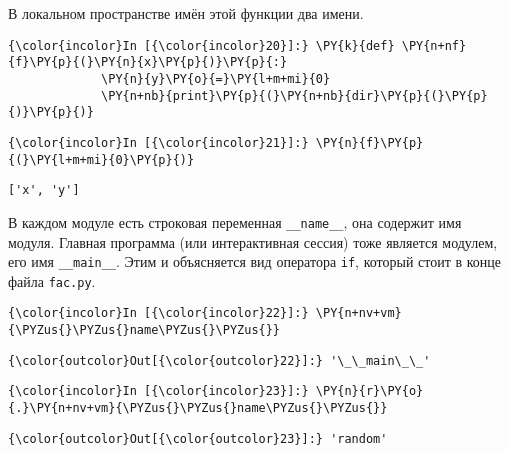    В локальном пространстве имён этой функции два имени.

    \begin{Verbatim}[commandchars=\\\{\}]
{\color{incolor}In [{\color{incolor}20}]:} \PY{k}{def} \PY{n+nf}{f}\PY{p}{(}\PY{n}{x}\PY{p}{)}\PY{p}{:}
             \PY{n}{y}\PY{o}{=}\PY{l+m+mi}{0}
             \PY{n+nb}{print}\PY{p}{(}\PY{n+nb}{dir}\PY{p}{(}\PY{p}{)}\PY{p}{)}
\end{Verbatim}

    \begin{Verbatim}[commandchars=\\\{\}]
{\color{incolor}In [{\color{incolor}21}]:} \PY{n}{f}\PY{p}{(}\PY{l+m+mi}{0}\PY{p}{)}
\end{Verbatim}

    \begin{Verbatim}[commandchars=\\\{\}]
['x', 'y']

    \end{Verbatim}

    В каждом модуле есть строковая переменная \texttt{\_\_name\_\_}, она
содержит имя модуля. Главная программа (или интерактивная сессия) тоже
является модулем, его имя \texttt{\_\_main\_\_}. Этим и объясняется вид
оператора \texttt{if}, который стоит в конце файла \texttt{fac.py}.

    \begin{Verbatim}[commandchars=\\\{\}]
{\color{incolor}In [{\color{incolor}22}]:} \PY{n+nv+vm}{\PYZus{}\PYZus{}name\PYZus{}\PYZus{}}
\end{Verbatim}

            \begin{Verbatim}[commandchars=\\\{\}]
{\color{outcolor}Out[{\color{outcolor}22}]:} '\_\_main\_\_'
\end{Verbatim}
        
    \begin{Verbatim}[commandchars=\\\{\}]
{\color{incolor}In [{\color{incolor}23}]:} \PY{n}{r}\PY{o}{.}\PY{n+nv+vm}{\PYZus{}\PYZus{}name\PYZus{}\PYZus{}}
\end{Verbatim}

            \begin{Verbatim}[commandchars=\\\{\}]
{\color{outcolor}Out[{\color{outcolor}23}]:} 'random'
\end{Verbatim}
        
